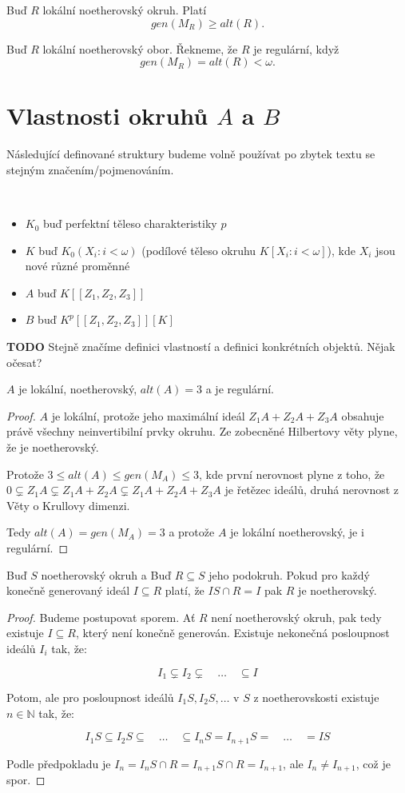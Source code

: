 \documentclass[11pt,a4paper]{article}
\newcommand\m[1]{\mathbb { #1 }} %
\newcommand\N{\m N}
\theoremstyle{definition}
\theoremstyle{plain}
\begin{document}
 Buď $R$ lokální noetherovský okruh. Platí
	$$gen(M_R) \geq alt(R).$$

 Buď $R$ lokální noetherovský obor. Řekneme, že $R$ je regulární, když
	$$gen(M_R) = alt(R) < \omega.$$
	
\section{Vlastnosti okruhů $A$ a $B$}
Následující definované struktury budeme volně používat po zbytek textu se
stejným značením/pojmenováním.

 ~\\[-1.5em]
\begin{itemize}
	\item $K_0$ buď perfektní těleso charakteristiky $p$
	\item $K$ buď $K_0(X_i : i < \omega)$ (podílové těleso okruhu $K[X_i : i <
	      \omega]$), kde $X_i$ jsou nové různé proměnné
	\item $A$ buď $K[[Z_1,Z_2,Z_3]]$
	\item $B$ buď $K^p[[Z_1,Z_2,Z_3]][K]$
\end{itemize}
\textbf{TODO} Stejně značíme definici vlastností a definici konkrétních
objektů. Nějak očesat?


\veta $A$ je lokální, noetherovský, $alt(A) = 3$ a je regulární.
\begin{proof}
	$A$ je lokální, protože jeho maximální ideál $Z_1A + Z_2A + Z_3A$ obsahuje
	právě všechny neinvertibilní prvky okruhu. Ze zobecněné Hilbertovy věty
	plyne, že je noetherovský.

	Protože $3 \leq alt(A) \leq gen(M_A) \leq 3$, kde první nerovnost plyne z
	toho, že $0 \subsetneq Z_1A \subsetneq Z_1A + Z_2A \subsetneq Z_1A + Z_2A +
	Z_3A$ je řetězec ideálů, druhá nerovnost z Věty o Krullovy dimenzi.

	Tedy $alt(A) = gen(M_A) = 3$ a protože $A$ je lokální noetherovský, je i
	regulární.
\end{proof}

\lemma Buď $S$ noetherovský okruh a Buď $R \subseteq S$ jeho podokruh. Pokud
pro každý konečně generovaný ideál $I \subseteq R$ platí, že $IS \cap R = I$
pak $R$ je noetherovský.
\begin{proof}
	Budeme postupovat sporem. Ať $R$ není noetherovský okruh, pak tedy existuje
	$I \subseteq R$, který není konečně generován. Existuje nekonečná
	posloupnost ideálů $I_i$ tak, že:

	$$I_1 \subsetneq I_2 \subsetneq \quad \ldots \quad \subseteq I$$

	\noindent Potom, ale pro posloupnost ideálů $I_1S, I_2S, \dots$ v $S$ z
	noetherovskosti existuje $n \in \N$ tak, že:

	$$I_1S \subseteq I_2S \subseteq \quad \ldots \quad \subseteq I_nS =
	I_{n+1}S = \quad \ldots \quad = IS$$

	\noindent Podle předpokladu je $I_n = I_nS \cap R = I_{n+1}S \cap R =
	I_{n+1}$, ale $I_n \not= I_{n+1}$, což je spor.
\end{proof}
\end{document}
